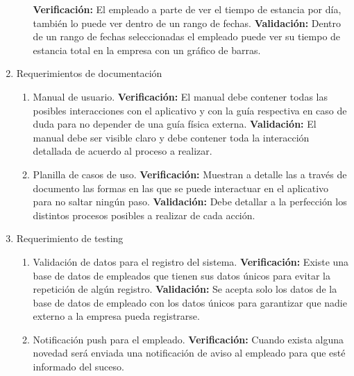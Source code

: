 \documentclass[
11pt, %
]{charter}
\begin{document}
\begin{enumerate}
\begin{enumerate}
			\newline
			\textbf{Verificación:}
			El empleado a parte de ver el tiempo de estancia por día, también lo puede ver dentro de un rango de fechas.
			\newline
		    \textbf{Validación:}
		    Dentro de un rango de fechas seleccionadas el empleado puede ver su tiempo de estancia total en la empresa con un gráfico de barras.
		\end{enumerate}
	\item Requerimientos de documentación
		\begin{enumerate}
			\item Manual de usuario.
			\newline
			\textbf{Verificación:}
			El manual debe contener todas las posibles interacciones con el aplicativo y con la guía respectiva en caso de duda para no depender de una guía física externa.
			\newline
		    \textbf{Validación:}
		    El manual debe ser visible claro y debe contener toda la interacción detallada de acuerdo al proceso a realizar.
			\item Planilla de casos de uso.
			\newline
			\textbf{Verificación:}
			Muestran a detalle las a través de documento las formas en las que se puede interactuar en el aplicativo para no saltar ningún paso.
			\newline
		    \textbf{Validación:}
		    Debe detallar a la perfección los distintos procesos posibles a realizar de cada acción.
		\end{enumerate}
	\item Requerimiento de testing
		\begin{enumerate}
			\item Validación de datos para el registro del sistema.
			\newline
			\textbf{Verificación:}
			Existe una base de datos de empleados que tienen sus datos únicos para evitar la repetición de algún registro.
			\newline
		    \textbf{Validación:}
		    Se acepta solo los datos de la base de datos de empleado con los datos únicos para garantizar que nadie externo a la empresa pueda registrarse.
			\item Notificación push para el empleado.
			\newline
			\textbf{Verificación:}
			Cuando exista alguna novedad será enviada una notificación de aviso al empleado para que esté informado del suceso.

\end{enumerate}
\end{enumerate}
\end{document}
